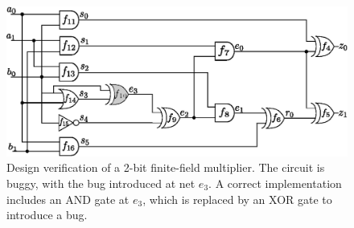

\vspace{2ex}

\begin{figure}[hbt]
    \begin{center}
    \includegraphics[scale = 0.5]{mas_red_bug.eps}
    \end{center}
    \caption{\small Design verification of a 2-bit finite-field
      multiplier. The circuit is buggy, with the bug introduced at
    net $e_3$. A correct implementation includes an AND gate at $e_3$,
    which is replaced by an XOR gate to introduce a bug.}
    \label{fig:mas_both}
    \vspace{-3ex}
\end{figure}

